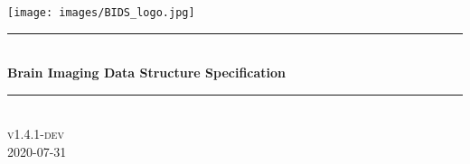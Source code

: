 \begin{titlepage}

\newcommand{\HRule}{\rule{\linewidth}{0.5mm}} %

\center %




\texttt{[image: images/BIDS\_logo.jpg]}\\[1cm] 


\HRule \\[0.4cm]
{ \huge \bfseries Brain Imaging Data Structure Specification}\\[0.4cm] %
\HRule \\[1.5cm]


\textsc{\large v1.4.1-dev}\\[0.5cm]{\large 2020-07-31}\\[2cm]\vfill\end{titlepage}
